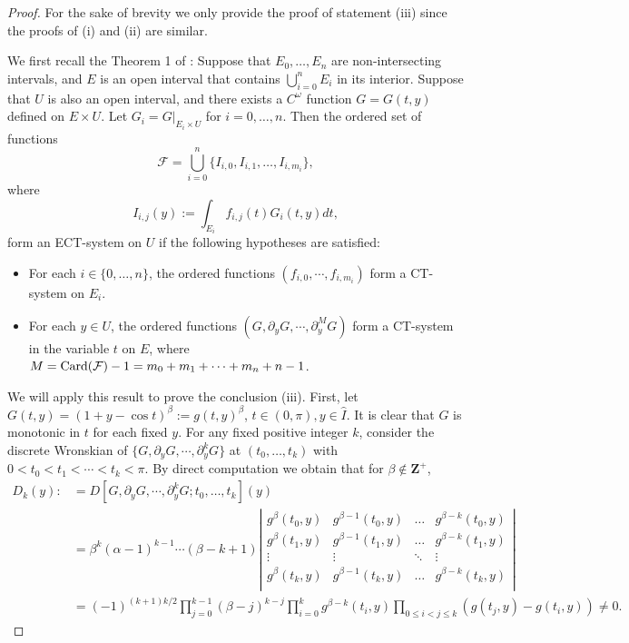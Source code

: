 \documentclass[11pt]{amsart}
\theoremstyle{remark}
\theoremstyle{definition}
\begin{document}
\begin{proof}  For the sake of brevity we only provide the proof of statement (iii) since the proofs  of (i) and (ii) are similar.

   We first recall the  Theorem 1 of \cite{HLZ2023}:   Suppose that $E_0,\ldots, E_n$ are non-intersecting intervals, and $E$ is an open interval that contains $\bigcup^n_{i=0} E_i$ in its interior.
Suppose that $U$ is also an open interval, and there exists a $C^{\omega}$ function $G=G(t,y)$ defined on $E\times U$. Let $G_i=G|_{E_i\times U}$ for $i=0,\ldots,n$.
Then the ordered set of functions
\begin{equation}\label{eqhlz2}
\mathcal{F}=\bigcup^{n}_{i=0}\{I_{i,0},I_{i,1},\ldots,I_{i,m_i}\},
\end{equation}
where
\begin{equation}\label{eqhlz3}
I_{i,j}(y):=\int_{E_i}f_{i,j}(t)G_{i}(t,y)dt,
\end{equation}   form an ECT-system on $U$ if the following hypotheses are satisfied:
\begin{itemize}
  \item [(H.1)] For each $i\in\{0,\ldots,n\}$, the  ordered functions $(f_{i,0},\cdots,f_{i,m_i})$ form  a CT-system on $E_i$.
  \item [(H.2)] For each $y\in U$, the  ordered functions $(G,\partial_y G, \cdots,\partial^{M}_y G)$ form  a CT-system in the variable $t$ on $E$, where $M={\rm Card}(\mathcal F)-1=m_0+m_1+\cdots+m_n+n-1$.
\end{itemize}


We will apply this result to prove the conclusion (iii). First,  let $G(t,y)=(1+y-\cos t)^{\beta}:=g(t,y)^{\beta}$, $t\in (0, \pi), y\in \hat{I}$. It is clear that  $G$  is monotonic in $t$ for each fixed $y$.
For any fixed positive integer $k$,  consider the discrete Wronskian   of $\{G,\partial_y G,\cdots,\partial^{k}_y G\}$ at $(t_0,\ldots,t_{k})$
with $0<t_0<t_1<\cdots<t_{k}<\pi$.
 By direct computation we obtain that for $\beta \notin \mathbf{Z}^+$,
  \begin{equation*}
\begin{split}
  D_k(y):&=D[G,\partial_y G,\cdots,\partial^{k}_y G;t_0,\ldots,t_{k}](y) \\
 & =\beta^k(\alpha-1)^{k-1}\cdots(\beta-k+1)\left|
  \begin{array}{ccccccc}
  g^{\beta}(t_0,y)    &g^{\beta-1}(t_0,y)          &\ldots   &g^{\beta-k}(t_0,y)\\
  g^{\beta}(t_1,y)      &g^{\beta-1}(t_1,y)       &\ldots   &g^{\beta-k}(t_1,y)   \\
  \vdots            &\vdots      &\ddots   &\vdots                 \\
 g^{\beta}(t_{k},y)      &g^{\beta-1}(t_k,y)   &\ldots   & g^{\beta-k}(t_{k},y)    \\
\end{array}
  \right|\\
&= (-1)^{(k+1)k/2}\prod_{j=0}^{k-1}(\beta-j)^{k-j}\prod_{i=0}^{k}g^{\beta-k}(t_i,y)\prod_{0\leq i<j\leq k}\left(g(t_j,y)-g(t_i,y)\right)\neq 0.
\end{split}\end{equation*}


\end{proof}
\end{document}
